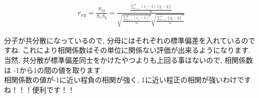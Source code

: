 \documentclass[11pt,a4paper]{jreport}
\begin{document}
\begin{eqnarray}
r_{xy} = \frac{S_{xy}}{S_x S_y} = \frac{\frac{\sum_{i=1}^{n} (x_i - \bar{x})(y_i - \bar{y})}{n}}{\sqrt{\frac{\sum_{i=1}^{n} (x_i - \bar{x})^2}{n}} \sqrt{\frac{\sum_{i=1}^{n} (y_i - \bar{y})^2}{n}}}
\end{eqnarray}

分子が共分散になっているので, 分母にはそれぞれの標準偏差を入れているのですね. これにより相関係数はその単位に関係ない評価が出来るようになります. 当然, 共分散が標準偏差同士をかけたやつよりも上回る事はないので, 相関係数は -1から1の間の値を取ります.\\
相関係数の値が-1に近い程負の相関が強く, 1に近い程正の相関が強いわけですね！！！便利です！！\\
\end{document}
